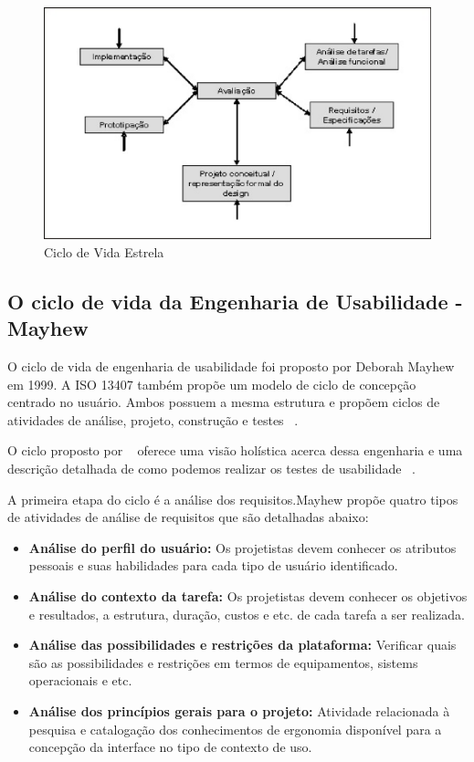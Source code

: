 \begin{figure}[h]
    \centering
    \includegraphics[keepaspectratio=true,scale=0.60]
      {figuras/estrela.eps}
    \caption{Ciclo de Vida Estrela~\cite{preece2005}}
    \label{ciclo_estrela}
\end{figure}

\subsection{O ciclo de vida da Engenharia de Usabilidade - Mayhew}

	O ciclo de vida de engenharia de usabilidade foi proposto por Deborah Mayhew em 1999. A ISO 13407 também propõe um modelo de ciclo de concepção centrado no usuário. Ambos possuem a mesma estrutura e propõem ciclos de atividades de análise, projeto, construção e testes ~\cite{cybis2010}.

	O ciclo proposto por ~ oferece uma visão holística acerca dessa engenharia e uma descrição detalhada de como podemos realizar os testes de usabilidade ~\cite{preece2005}.

	A primeira etapa do ciclo é a análise dos requisitos.Mayhew propõe quatro tipos de atividades de análise de requisitos que são detalhadas abaixo:

\begin{itemize}
\item \textbf{Análise do perfil do usuário:} Os projetistas devem conhecer os atributos pessoais e suas habilidades para cada tipo de usuário identificado. 
	
\item \textbf{Análise do contexto da tarefa:} Os projetistas devem conhecer os objetivos e resultados, a estrutura, duração, custos e etc. de cada tarefa a ser realizada.

\item \textbf{Análise das possibilidades e restrições da plataforma:} Verificar quais são as possibilidades e restrições em termos de equipamentos, sistems operacionais e etc.

\item \textbf{Análise dos princípios gerais para o projeto:} Atividade relacionada à pesquisa e catalogação dos conhecimentos de ergonomia disponível para a concepção da interface no tipo de contexto de uso.

\end{itemize}


